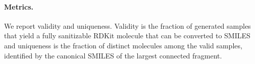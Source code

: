 \documentclass{article}
\theoremstyle{plain}
\begin{document}
\paragraph{Metrics.}
We report validity and uniqueness. Validity is the fraction of generated samples that yield a fully sanitizable RDKit molecule that can be converted to SMILES and uniqueness is the fraction of distinct molecules among the valid samples, identified by the canonical SMILES of the largest connected fragment. 

\newpage
\end{document}
